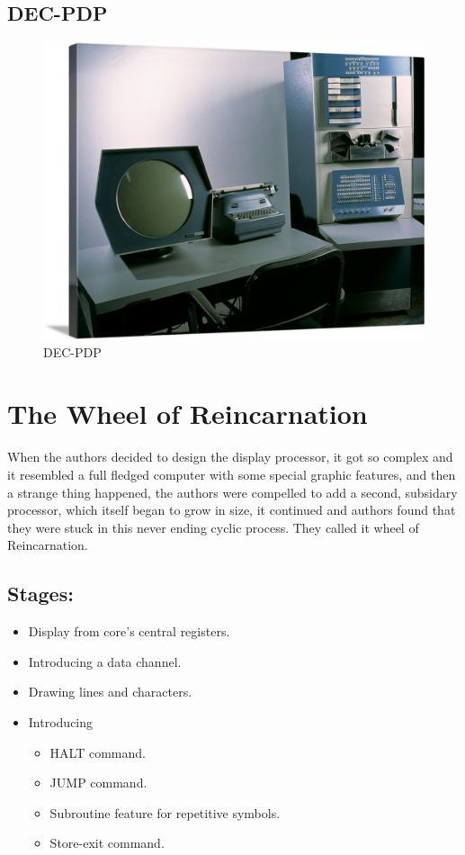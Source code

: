 \documentclass[11pt]{article}
\begin{document}
\subsection{DEC-PDP}
\label{sec:orge68286a}
\begin{figure}[htbp]
\centering
\includegraphics[width=.9\linewidth]{./images/pdp-1.jpg}
\caption{DEC-PDP}
\end{figure}
\section{The Wheel of Reincarnation}
\label{sec:org6a67b8e}

When the authors decided to design the display processor, it got so complex
and it resembled a full fledged computer with some special graphic features,
and then a strange thing happened, the authors were compelled to add a 
second, subsidary processor, which itself began to grow in size, it continued
and authors found that they were stuck in this never ending cyclic process.
They called it wheel of Reincarnation.

\subsection{Stages:}
\label{sec:org1d63e42}

\begin{itemize}
\item Display from core's central registers.
\item Introducing a data channel.
\item Drawing lines and characters.
\item Introducing
\begin{itemize}
\item HALT command.
\item JUMP command.
\item Subroutine feature for repetitive symbols.
\item Store-exit command.
\end{itemize}
\end{itemize}
\end{document}
